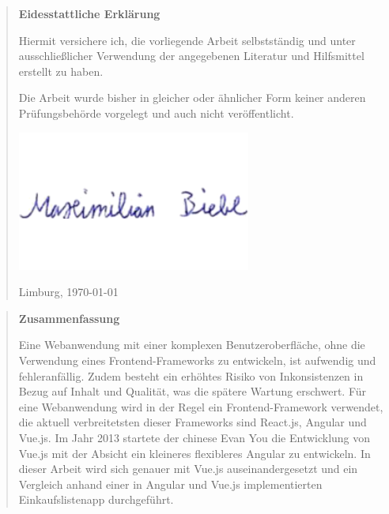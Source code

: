 \documentclass[%
    BCOR=8.25mm,         %
    DIV=12,              %
    parskip=half,                 %
    bibliography=totoc,     %
    headsepline=on,      %
]{scrbook}
\begin{document}
    \pagestyle{empty}
    \begin{quote}
        \vspace*{4cm}

        \begin{center}
            \textbf{\Large\sffamily Eidesstattliche Erklärung}
        \end{center}

        Hiermit versichere ich, die vorliegende Arbeit selbstständig und unter
        ausschließlicher Verwendung der angegebenen Literatur und Hilfsmittel
        erstellt zu haben.

        Die Arbeit wurde bisher in gleicher oder ähnlicher Form keiner anderen
        Prüfungsbehörde vorgelegt und auch nicht veröffentlicht.

        \vspace{2em}
        \includegraphics[scale=0.5]{img/signature}

        Limburg, \today
    \end{quote}
    \cleardoubleemptypage

    \pagestyle{empty}
    \begin{quote}
        \vspace*{4cm}

        \begin{center}
            \textbf{\Large\sffamily Zusammenfassung}
        \end{center}
        Eine Webanwendung mit einer komplexen Benutzeroberfläche, ohne die Verwendung eines Frontend-Frameworks zu entwickeln, ist aufwendig und fehleranfällig.
        Zudem besteht ein erhöhtes Risiko von Inkonsistenzen in Bezug auf Inhalt und Qualität, was die spätere Wartung erschwert.
        Für eine Webanwendung wird in der Regel ein Frontend-Framework verwendet, die aktuell verbreitetsten dieser Frameworks sind React.js, Angular und Vue.js.
        Im Jahr 2013 startete der chinese Evan You die Entwicklung von Vue.js mit der Absicht ein kleineres flexibleres Angular zu entwickeln.
        In dieser Arbeit wird sich genauer mit Vue.js auseinandergesetzt und ein Vergleich anhand einer in Angular und Vue.js implementierten Einkaufslistenapp durchgeführt.
    \end{quote}
    \cleardoubleemptypage
\end{document}
